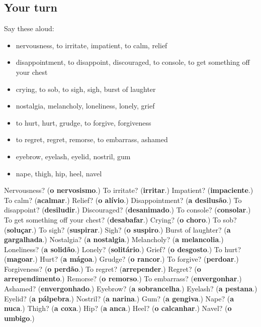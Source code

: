 \subsection*{Your turn}
Say these aloud:

\begin{itemize}
\raggedright
  \item nervousness, to irritate, impatient, to calm, relief
  \item disappointment, to disappoint, discouraged, to console, to get something off your chest
  \item crying, to sob, to sigh, sigh, burst of laughter
  \item nostalgia, melancholy, loneliness, lonely, grief
  \item to hurt, hurt, grudge, to forgive, forgiveness
  \item to regret, regret, remorse, to embarrass, ashamed
  \item eyebrow, eyelash, eyelid, nostril, gum
  \item nape, thigh, hip, heel, navel
\end{itemize}

\begin{tcolorbox}[breakable,colback=teal!4,colframe=teal!35!black,title={Before you move on}]
Nervousness? (\textbf{o nervosismo}.) To irritate? (\textbf{irritar}.) Impatient? (\textbf{impaciente}.) To calm? (\textbf{acalmar}.) Relief? (\textbf{o alívio}.) Disappointment? (\textbf{a desilusão}.) To disappoint? (\textbf{desiludir}.) Discouraged? (\textbf{desanimado}.) To console? (\textbf{consolar}.) To get something off your chest? (\textbf{desabafar}.) Crying? (\textbf{o choro}.) To sob? (\textbf{soluçar}.) To sigh? (\textbf{suspirar}.) Sigh? (\textbf{o suspiro}.) Burst of laughter? (\textbf{a gargalhada}.) Nostalgia? (\textbf{a nostalgia}.) Melancholy? (\textbf{a melancolia}.) Loneliness? (\textbf{a solidão}.) Lonely? (\textbf{solitário}.) Grief? (\textbf{o desgosto}.) To hurt? (\textbf{magoar}.) Hurt? (\textbf{a mágoa}.) Grudge? (\textbf{o rancor}.) To forgive? (\textbf{perdoar}.) Forgiveness? (\textbf{o perdão}.) To regret? (\textbf{arrepender}.) Regret? (\textbf{o arrependimento}.) Remorse? (\textbf{o remorso}.) To embarrass? (\textbf{envergonhar}.) Ashamed? (\textbf{envergonhado}.) Eyebrow? (\textbf{a sobrancelha}.) Eyelash? (\textbf{a pestana}.) Eyelid? (\textbf{a pálpebra}.) Nostril? (\textbf{a narina}.) Gum? (\textbf{a gengiva}.) Nape? (\textbf{a nuca}.) Thigh? (\textbf{a coxa}.) Hip? (\textbf{a anca}.) Heel? (\textbf{o calcanhar}.) Navel? (\textbf{o umbigo}.)
\end{tcolorbox}
